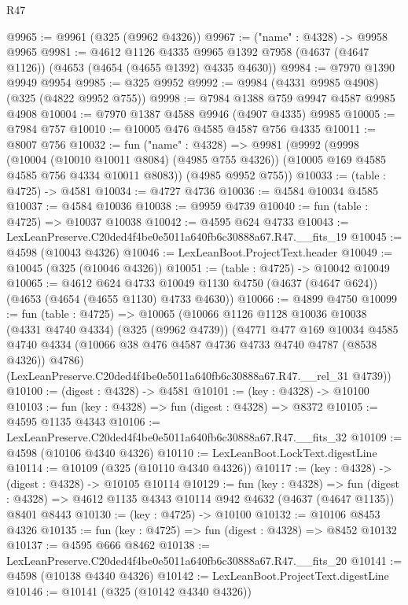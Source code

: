 \begin{lexlean}{R47}
\begin{coremodule}
@9965 := @9961 (@325 (@9962 @4326))
@9967 := ("name" : @4328) -> @9958 @9965
@9981 := @4612
    @1126
    @4335
    @9965
    @1392
    @7958
    (@4637 (@4647 @1126))
    (@4653 (@4654 (@4655 @1392) @4335 @4630))
@9984 := @7970 @1390 @9949 @9954
@9985 := @325 @9952
@9992 := @9984 (@4331 @9985 @4908) (@325 (@4822 @9952 @755))
@9998 := @7984 @1388 @759 @9947 @4587 @9985 @4908
@10004 := @7970 @1387 @4588 @9946 (@4907 @4335) @9985
@10005 := @7984 @757
@10010 := @10005 @476 @4585 @4587 @756 @4335
@10011 := @8007 @756
@10032 := fun ("name" : @4328) =>
  @9981
    (@9992
      (@9998
        (@10004 (@10010 @10011 @8084) (@4985 @755 @4326))
        (@10005 @169 @4585 @4585 @756 @4334 @10011 @8083))
      (@4985 @9952 @755))
@10033 := (table : @4725) -> @4581
@10034 := @4727 @4736
@10036 := @4584 @10034 @4585
@10037 := @4584 @10036
@10038 := @9959 @4739
@10040 := fun (table : @4725) => @10037 @10038
@10042 := @4595 @624 @4733
@10043 := LexLeanPreserve.C20ded4f4be0e5011a640fb6c30888a67.R47.__fits_19
@10045 := @4598 (@10043 @4326)
@10046 := LexLeanBoot.ProjectText.header
@10049 := @10045 (@325 (@10046 @4326))
@10051 := (table : @4725) -> @10042 @10049
@10065 := @4612
    @624
    @4733
    @10049
    @1130
    @4750
    (@4637 (@4647 @624))
    (@4653 (@4654 (@4655 @1130) @4733 @4630))
@10066 := @4899 @4750
@10099 := fun (table : @4725) =>
  @10065
    (@10066
      @1126
      @1128
      @10036
      @10038
      (@4331 @4740 @4334)
      (@325 (@9962 @4739))
      (@4771
        @477
        @169
        @10034
        @4585
        @4740
        @4334
        (@10066 @38 @476 @4587 @4736 @4733 @4740 @4787 (@8538 @4326))
        @4786)
      (LexLeanPreserve.C20ded4f4be0e5011a640fb6c30888a67.R47.__rel_31 @4739))
@10100 := (digest : @4328) -> @4581
@10101 := (key : @4328) -> @10100
@10103 := fun (key : @4328) => fun (digest : @4328) => @8372
@10105 := @4595 @1135 @4343
@10106 := LexLeanPreserve.C20ded4f4be0e5011a640fb6c30888a67.R47.__fits_32
@10109 := @4598 (@10106 @4340 @4326)
@10110 := LexLeanBoot.LockText.digestLine
@10114 := @10109 (@325 (@10110 @4340 @4326))
@10117 := (key : @4328) -> (digest : @4328) -> @10105 @10114
@10129 := fun (key : @4328) =>
  fun (digest : @4328) => @4612 @1135 @4343 @10114 @942 @4632 (@4637 (@4647 @1135)) @8401 @8443
@10130 := (key : @4725) -> @10100
@10132 := @10106 @8453 @4326
@10135 := fun (key : @4725) => fun (digest : @4328) => @8452 @10132
@10137 := @4595 @666 @8462
@10138 := LexLeanPreserve.C20ded4f4be0e5011a640fb6c30888a67.R47.__fits_20
@10141 := @4598 (@10138 @4340 @4326)
@10142 := LexLeanBoot.ProjectText.digestLine
@10146 := @10141 (@325 (@10142 @4340 @4326))

\end{coremodule}
\end{lexlean}
